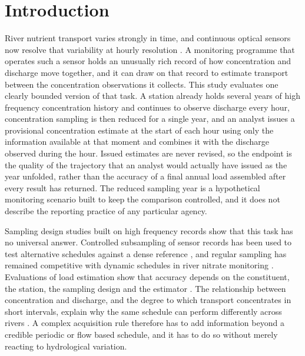 \documentclass[lineno,pdflatex,sn-apa]{sn-jnl}%
\theoremstyle{thmstyleone}%
\theoremstyle{thmstyletwo}%
\theoremstyle{thmstylethree}%
\begin{document}



\maketitle



\section{Introduction}\label{sec:introduction}

River nutrient transport varies strongly in time, and continuous optical sensors now resolve that variability at hourly resolution \citep{rode2016,bieroza2023}. A monitoring programme that operates such a sensor holds an unusually rich record of how concentration and discharge move together, and it can draw on that record to estimate transport between the concentration observations it collects. This study evaluates one clearly bounded version of that task. A station already holds several years of high frequency concentration history and continues to observe discharge every hour, concentration sampling is then reduced for a single year, and an analyst issues a provisional concentration estimate at the start of each hour using only the information available at that moment and combines it with the discharge observed during the hour. Issued estimates are never revised, so the endpoint is the quality of the trajectory that an analyst would actually have issued as the year unfolded, rather than the accuracy of a final annual load assembled after every result has returned. The reduced sampling year is a hypothetical monitoring scenario built to keep the comparison controlled, and it does not describe the reporting practice of any particular agency.

Sampling design studies built on high frequency records show that this task has no universal answer. Controlled subsampling of sensor records has been used to test alternative schedules against a dense reference \citep{rode2016,bieroza2023}, and regular sampling has remained competitive with dynamic schedules in river nitrate monitoring \citep{reynolds2016}. Evaluations of load estimation show that accuracy depends on the constituent, the station, the sampling design and the estimator \citep{lee2016,lee2019}. The relationship between concentration and discharge, and the degree to which transport concentrates in short intervals, explain why the same schedule can perform differently across rivers \citep{bieroza2018,moatar2007}. A complex acquisition rule therefore has to add information beyond a credible periodic or flow based schedule, and it has to do so without merely reacting to hydrological variation.
\end{document}
